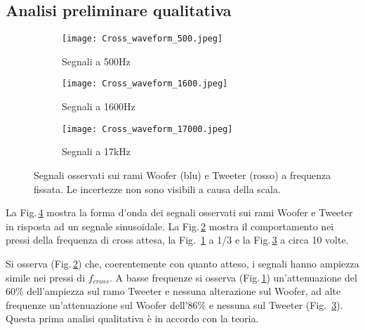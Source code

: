 \documentclass[../Relazione_circuiti]{subfiles}
\begin{document}
\subsection{Analisi preliminare qualitativa}

  \begin{figure}[H]
    \centering

    \begin{subfigure}[b]{0.3\textwidth}
      \centering
      \texttt{[image: Cross\_waveform\_500.jpeg]}

      \caption{Segnali a 500Hz}
      \label{fig:signal_500}

    \end{subfigure}
    \hfill
    \begin{subfigure}[b]{0.3\textwidth}
      \centering
      \texttt{[image: Cross\_waveform\_1600.jpeg]}

      \caption{Segnali a 1600Hz}
      \label{fig:signal_1600}

    \end{subfigure}
    \hfill
    \begin{subfigure}[b]{0.3\textwidth}
      \centering
      \texttt{[image: Cross\_waveform\_17000.jpeg]}

      \caption{Segnali a 17kHz}
      \label{fig:signal_17k}

    \end{subfigure}
    \hfill

    \caption{Segnali osservati sui rami Woofer (blu) e Tweeter (rosso)
      a frequenza fissata. Le incertezze non sono visibili a causa della scala.}

    \label{fig:signal_waveforms}

  \end{figure}


  La Fig.\,\ref{fig:signal_waveforms} mostra la forma d'onda dei segnali osservati sui rami Woofer e Tweeter in risposta
  ad un segnale sinusoidale.
  La Fig.\,\ref{fig:signal_1600} mostra il comportamento nei pressi della frequenza di cross attesa, la Fig.
  \,\ref{fig:signal_500} a 1/3 e la Fig.\,\ref{fig:signal_17k} a circa 10 volte.

  Si osserva (Fig.\,\ref{fig:signal_1600}) che, coerentemente con quanto atteso, i segnali hanno ampiezza simile nei
  pressi di $f_{cross}$.
  A basse frequenze si osserva (Fig.\,\ref{fig:signal_500}) un'attenuazione del 60\% dell'ampiezza sul ramo Tweeter e
  nessuna alterazione sul Woofer, ad alte frequenze un'attenuazione sul Woofer dell'86\% e nessuna sul Tweeter (Fig.
  \,\ref{fig:signal_17k}). Questa prima analisi qualitativa è in accordo con la teoria.
\end{document}
